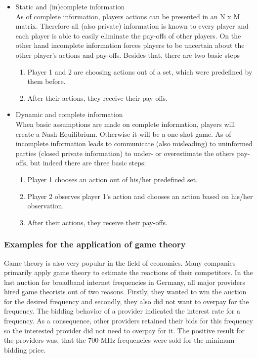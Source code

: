 \begin{itemize}
	\item Static and (in)complete information\\
	As of complete information, players actions can be presented in an N x M matrix.
	Therefore all (also private) information is known to every player and each player is able to easily eliminate the pay-offs of other players.
	On the other hand incomplete information forces players to be uncertain about the other player's actions and pay-offs.
	Besides that, there are two basic steps
	\begin{enumerate}
		\item Player 1 and 2 are choosing actions out of a set, which were predefined by them before.
		\item After their actions, they receive their pay-offs.
	\end{enumerate}
	\item Dynamic and complete information\\
	When basic assumptions are made on complete information, players will create a Nash Equilibrium. 
	Otherwise it will be a one-shot game.
	As of incomplete information leads to communicate (also misleading) to uninformed parties (closed private information) to under- or overestimate the others pay-offs, but indeed there are three basic steps: 
	\begin{enumerate}
		\item Player 1 chooses an action out of his/her predefined set.
		\item Player 2 observes player 1's action and chooses an action based on his/her observation.
		\item After their actions, they receive their pay-offs.
	\end{enumerate}
\end{itemize}


\subsubsection{Examples for the application of game theory}
Game theory is also very popular in the field of economics.
Many companies primarily apply game theory to estimate the reactions of their competitors. 
In the last auction for broadband internet frequencies in Germany, all major providers hired game theorists out of two reasons. 
Firstly, they wanted to win the auction for the desired frequency and secondly, they also did not want to overpay for the frequency.
The bidding behavior of a provider indicated the interest rate for a frequency. 
As a consequence, other providers retained their bids for this frequency so the interested provider did not need to overpay for it. 
The positive result for the providers was, that the 700-MHz frequencies were sold for the minimum bidding price. \cite{gametheoryWelt}

